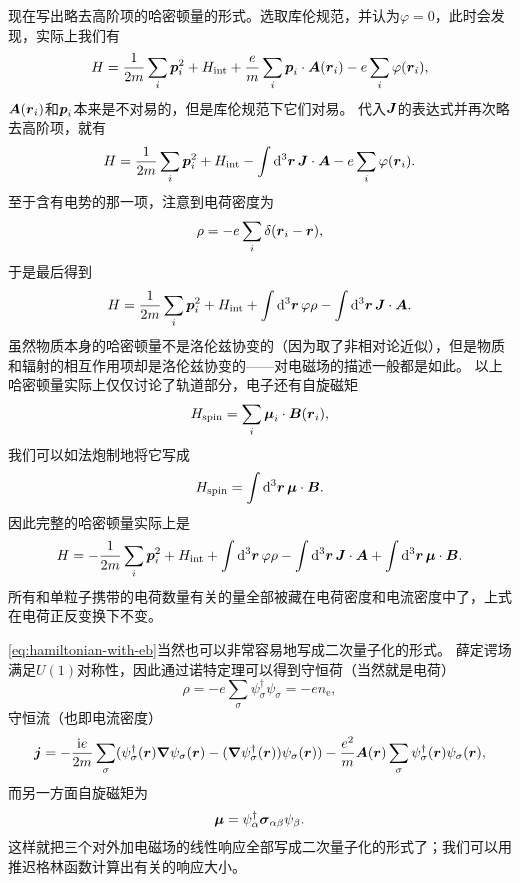 现在写出略去高阶项的哈密顿量的形式。选取库伦规范，并认为$\varphi=0$，此时会发现，实际上我们有
\[
    {H} = \frac{1}{2m} \sum_i {\vb*{p}}_i^2 + {H}_\text{int} + \frac{e}{m} \sum_i {\vb*{p}}_i \cdot \vb*{A}({\vb*{r}}_i) - e \sum_i \varphi({\vb*{r}_i}),
\]
$\vb*{A}({\vb*{r}}_i)$和${\vb*{p}}_i$本来是不对易的，但是库伦规范下它们对易。
代入${\vb*{J}}$的表达式并再次略去高阶项，就有
\[
    {H} = \frac{1}{2m} \sum_i {\vb*{p}}_i^2 + {H}_\text{int} - \int \dd[3]{\vb*{r}} {\vb*{J}} \cdot \vb*{A} - e \sum_i \varphi({\vb*{r}_i}).
\]
至于含有电势的那一项，注意到电荷密度为
\[
    {\rho} = - e \sum_{i} \delta({\vb*{r}}_i - \vb*{r}),
\]
于是最后得到
\begin{equation}
    {H} = \frac{1}{2m} \sum_i {\vb*{p}}_i^2 + {H}_\text{int} + \int \dd[3]{\vb*{r}} \varphi {\rho} - \int \dd[3]{\vb*{r}} {\vb*{J}} \cdot \vb*{A}.
\end{equation}
虽然物质本身的哈密顿量不是洛伦兹协变的（因为取了非相对论近似），但是物质和辐射的相互作用项却是洛伦兹协变的——对电磁场的描述一般都是如此。
以上哈密顿量实际上仅仅讨论了轨道部分，电子还有自旋磁矩
\[
    {H}_{\text{spin}} = \sum_i {\vb*{\mu}}_i \cdot \vb*{B}({\vb*{r}}_i),
\]
我们可以如法炮制地将它写成
\[
    {H}_{\text{spin}} = \int \dd[3]{\vb*{r}} {\vb*{\mu}} \cdot \vb*{B}.
\]
因此完整的哈密顿量实际上是
\begin{equation}
    {H} = - \frac{1}{2m} \sum_i {\vb*{p}}_i^2 + {H}_\text{int} + \int \dd[3]{\vb*{r}} \varphi {\rho} - \int \dd[3]{\vb*{r}} {\vb*{J}} \cdot \vb*{A} + \int \dd[3]{\vb*{r}} {\vb*{\mu}} \cdot \vb*{B}.
    \label{eq:hamiltonian-with-eb}
\end{equation}
所有和单粒子携带的电荷数量有关的量全部被藏在电荷密度和电流密度中了，上式在电荷正反变换下不变。

\eqref{eq:hamiltonian-with-eb}当然也可以非常容易地写成二次量子化的形式。
薛定谔场满足$U(1)$对称性，因此通过诺特定理可以得到守恒荷（当然就是电荷）
\begin{equation}
    \rho = - e \sum_\sigma {\psi}^\dagger_\sigma {\psi}_\sigma = - e {n}_\text{e},
\end{equation}
守恒流（也即电流密度）
\begin{equation}
    {\vb*{j}} = - \frac{\mathrm{i} e}{2m} \sum_\sigma ({\psi}_\sigma^\dagger(\vb*{r}) \grad{{\psi}_\sigma}(\vb*{r}) - (\grad{{\psi}_\sigma^\dagger}(\vb*{r})) {\psi}_\sigma(\vb*{r})) - \frac{e^2}{m} \vb*{A}(\vb*{r}) \sum_\sigma {\psi}^\dagger_\sigma(\vb*{r}) {\psi}_\sigma(\vb*{r}),
\end{equation}
而另一方面自旋磁矩为
\begin{equation}
    {\vb*{\mu}} = {\psi}^\dagger_\alpha \vb*{\sigma}_{\alpha \beta} {\psi}_\beta.
\end{equation}
这样就把三个对外加电磁场的线性响应全部写成二次量子化的形式了；我们可以用推迟格林函数计算出有关的响应大小。

